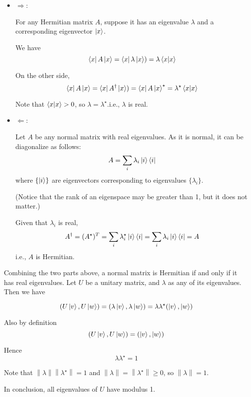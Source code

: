\documentclass{homeworg}
\begin{document}
\exercise*
\begin{itemize}
    \item $\Rightarrow$:
    
    For any Hermitian matrix $A$, suppose it has an eigenvalue $\lambda$ and a corresponding eigenvector $\ket{x}$.
    
    We have
    \[\bra{x}A\ket{x}=\bra{x}\lambda\ket{x})=\lambda\braket{x|x}\]
    
    On the other side,
    \[\bra{x}A\ket{x}=\bra{x}A^\dagger\ket{x})=\bra{x}A\ket{x}^\star=\lambda^\star\braket{x|x}\]
    
    Note that $\braket{x|x}> 0$, so $\lambda=\lambda^\star$.i.e., $\lambda$ is real.
    \item $\Leftarrow$:
    
    Let $A$ be any normal matrix with real eigenvalues. As it is normal, it can be diagonalize as follows:
    \[A=\sum_i\lambda_i\ket{i}\bra{i}\]
    where $\{\ket{i}\}$ are eigenvectors corresponding to eigenvalues $\{\lambda_i\}$. 
    
    (Notice that the rank of an eigenspace may be greater than 1, but it does not matter.)
    
    Given that $\lambda_i$ is real, \[A^\dagger=(A^\star)^T=\sum_i\lambda_i^\star\ket{i}\bra{i}=\sum_i\lambda_i\ket{i}\bra{i}=A\]
    i.e., $A$ is Hermitian.
\end{itemize}
Combining the two parts above, a normal matrix is Hermitian if and only if it has real eigenvalues.
\exercise*
Let $U$ be a unitary matrix, and $\lambda$ as any of its eigenvalues. Then we have

\[(U\ket{v},U\ket{w})=(\lambda\ket{v},\lambda\ket{w})=\lambda\lambda^\star(\ket{v},\ket{w})\]

Also by definition
\[(U\ket{v},U\ket{w})=(\ket{v},\ket{w})\]

Hence 
\[\lambda\lambda^\star=1\]

Note that $\left\|\lambda\right\|\left\|\lambda^\star\right\|=1$ and $\left\|\lambda\right\|=\left\|\lambda^\star\right\|\geq0$, so $\left\|\lambda\right\|=1$.

In conclusion, all eigenvalues of $U$ have modulus 1.
\end{document}
